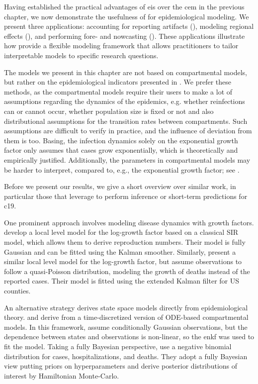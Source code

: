 \newpage
Having established the practical advantages of \acrshort{eis} over the \acrshort{cem} in the previous chapter, we now demonstrate the usefulness of  for epidemiological modeling. We present three applications: accounting for reporting artifacts (), modeling regional effects (), and performing fore- and nowcasting (). These applications illustrate how  provide a flexible modeling framework that allows practitioners to tailor interpretable models to specific research questions.

The models we present in this chapter are not based on compartmental models, but rather on the epidemiological indicators presented in . We prefer these methods, as the compartmental models require their users to make a lot of assumptions regarding the dynamics of the epidemics, e.g. whether reinfections can or cannot occur, whether population size is fixed or not and also distributional assumptions for the transition rates between compartments. 
Such assumptions are difficult to verify in practice, and the influence of deviation from them is too. Basing, the infection dynamics solely on the exponential growth factor only assumes that cases grow exponentially, which is theoretically and empirically justified. 
Additionally, the parameters in compartmental models may be harder to interpret, compared to, e.g., the exponential growth factor; see .

Before we present our results, we give a short overview over similar work, in particular those that leverage  to perform inference or short-term predictions for \acrshort{c19}.

One prominent approach involves modeling disease dynamics with growth factors. \citep{Arroyo-Marioli2021Tracking} develop a local level model for the log-growth factor based on a classical SIR model, which allows them to derive reproduction numbers. Their model is fully Gaussian and can be fitted using the Kalman smoother. Similarly, \citep{Ives2021Estimating} present a similar local level model for the log-growth factor, but assume observations to follow a quasi-Poisson distribution, modeling the growth of deaths instead of the reported cases. Their model is fitted using the extended Kalman filter for US counties.

An alternative strategy derives state space models directly from epidemiological theory. \citep{Lal2021Application} and \citep{Keller2022Tracking} derive  from a time-discretized version of ODE-based compartmental models. In this framework, \citep{Lal2021Application} assume conditionally Gaussian observations, but the dependence between states and observations is non-linear, so the \acrshort{enkf} was used to fit the model. Taking a fully Bayesian perspective, \citep{Keller2022Tracking} use a negative binomial distribution for cases, hospitalizations, and deaths. They adopt a fully Bayesian view putting priors on hyperparameters and derive posterior distributions of interest by Hamiltonian Monte-Carlo.

